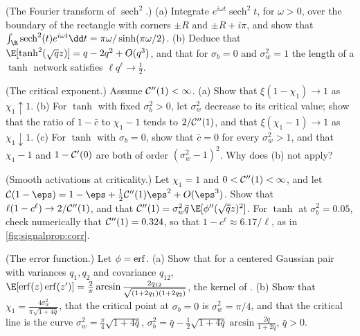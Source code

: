 \begin{refsection}
\begin{exercises}
\item \consolidation (The Fourier transform of $\operatorname{sech}^2$.) (a) Integrate $e^{i\omega t}\operatorname{sech}^2t$, for $\omega>0$, over the boundary of the rectangle with corners $\pm R$ and $\pm R+i\pi$, and show that $\int_\R\operatorname{sech}^2(t)e^{i\omega t}\dd t=\pi\omega/\sinh(\pi\omega/2)$. (b) Deduce that $\E[\tanh^2(\sqrt qz)]=q-2q^2+O(q^3)$, and that for $\sigma_b=0$ and $\sigma_w^2=1$ the length of a $\tanh$ network satisfies $\ell q^\ell\to\frac12$. \label{ex:signalprop:fourier}

\item \consolidation\hard (The critical exponent.) Assume $\mathcal{C}''(1)<\infty$. (a) Show that $\xi(1-\chi_1)\to1$ as $\chi_1\uparrow1$. (b) For $\tanh$ with fixed $\sigma_b^2>0$, let $\sigma_w^2$ decrease to its critical value; show that the ratio of $1-\bar c$ to $\chi_1-1$ tends to $2/\mathcal{C}''(1)$, and that $\xi(\chi_1-1)\to1$ as $\chi_1\downarrow1$. (c) For $\tanh$ with $\sigma_b=0$, show that $\bar c=0$ for every $\sigma_w^2>1$, and that $\chi_1-1$ and $1-\mathcal{C}'(0)$ are both of order $(\sigma_w^2-1)^2$. Why does (b) not apply?\label{ex:signalprop:exponent}

\item \consolidation (Smooth activations at criticality.) Let $\chi_1=1$ and $0<\mathcal{C}''(1)<\infty$, and let $\signalpropC(1-\eps)=1-\eps+\frac12\signalpropC''(1)\eps^2+O(\eps^3)$. Show that $\ell(1-c^\ell)\to2/\mathcal{C}''(1)$, and that $\signalpropC''(1)=\sigma_w^2\bar q\,\E[\phi''(\sqrt{\bar q}z)^2]$. For $\tanh$ at $\sigma_b^2=0.05$, check numerically that $\mathcal{C}''(1)=0.324$, so that $1-c^\ell\approx6.17/\ell$, as in \cref{fig:signalprop:corr}. \label{ex:signalprop:smooth}

\item \variation (The error function.) Let $\phi=\operatorname{erf}$. (a) Show that for a centered Gaussian pair with variances $q_1,q_2$ and covariance $q_{12}$, $\E[\erf(z)\erf(z')]=\frac2\pi\arcsin\frac{2q_{12}}{\sqrt{(1+2q_1)(1+2q_2)}}$, the kernel of \textcite{Williams1997}. (b) Show that $\chi_1=\frac{4\sigma_w^2}{\pi\sqrt{1+4\bar q}}$, that the critical point at $\sigma_b=0$ is $\sigma_w^2=\pi/4$, and that the critical line is the curve $\sigma_w^2=\frac\pi4\sqrt{1+4\bar q}$, $\sigma_b^2=\bar q-\frac12\sqrt{1+4\bar q}\arcsin\frac{2\bar q}{1+2\bar q}$, $\bar q>0$. \label{ex:signalprop:erf}


\end{exercises}
\end{refsection}
